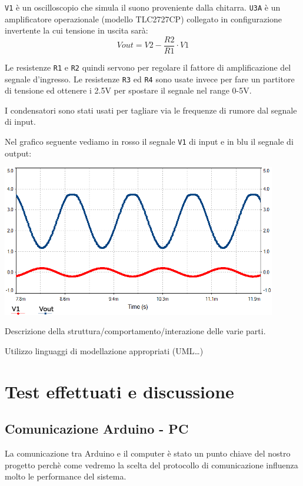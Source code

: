 \documentclass[a4paper,11pt]{article}
\begin{document}
\texttt{V1} è un oscilloscopio che simula il suono proveniente dalla chitarra.
\texttt{U3A} è un amplificatore operazionale (modello TLC2727CP) collegato in configurazione invertente la cui tensione in uscita sarà: $$Vout = V2 - \frac{R2}{R1} \cdot V1 $$
 
Le resistenze \texttt{R1} e \texttt{R2} quindi servono per regolare il fattore di amplificazione del segnale d'ingresso. Le resistenze \texttt{R3} ed \texttt{R4} sono usate invece per fare un partitore di tensione ed ottenere i 2.5V per spostare il segnale nel range 0-5V.

I condensatori sono stati usati per tagliare via le frequenze di rumore dal segnale di input.

\vspace{0.2in}
\newpage
Nel grafico seguente vediamo in rosso il segnale \texttt{V1} di input e in blu il segnale di output:
\vspace{0.1in}

\begin{center}
\includegraphics[width=0.9\textwidth]{screen2.png}
\end{center}

Descrizione della struttura/comportamento/interazione delle varie parti.

Utilizzo linguaggi di modellazione appropriati (UML…)

\section{Test effettuati e discussione}

\subsection{Comunicazione Arduino - PC}
La comunicazione tra Arduino e il computer è stato un punto chiave del nostro progetto perchè come vedremo la scelta del protocollo di comunicazione influenza molto le performance del sistema. 
\end{document}
